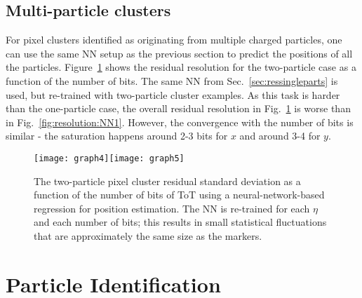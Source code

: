 \documentclass[12pt]{article}
\begin{document}
\subsection{Multi-particle clusters}

For pixel clusters identified as originating from multiple charged particles, one can use the same NN setup as the previous section to predict the positions of all the particles.  Figure~\ref{fig:resolution:NN2} shows the residual resolution for the two-particle case as a function of the number of bits.  The same NN from Sec.~\ref{sec:ressingleparts} is used, but re-trained with two-particle cluster examples.  As this task is harder than the one-particle case, the overall residual resolution in Fig.~\ref{fig:resolution:NN2} is worse than in Fig.~\ref{fig:resolution:NN1}.  However, the convergence with the number of bits is similar - the saturation happens around 2-3 bits for $x$ and around 3-4 for $y$.

\begin{figure}[h!]
\centering
\texttt{[image: graph4]}\texttt{[image: graph5]}
\caption{The two-particle pixel cluster residual standard deviation as a function of the number of bits of ToT using a neural-network-based regression for position estimation.  The NN is re-trained for each $\eta$ and each number of bits; this results in small statistical fluctuations that are approximately the same size as the markers.}
\label{fig:resolution:NN2}
\end{figure}

\clearpage

\section{Particle Identification}
\label{sec:pid}
\end{document}
